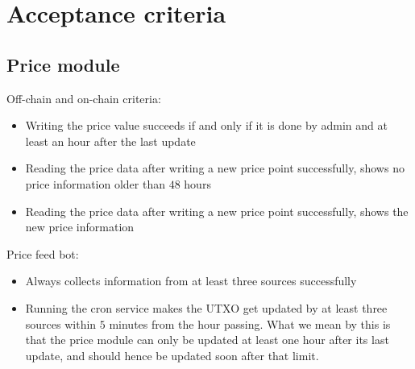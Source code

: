 \documentclass{article} %
\begin{document}
\section{Acceptance criteria}

\subsection{Price module}

Off-chain and on-chain criteria:
\begin{itemize}
  \item Writing the price value succeeds if and only if it is done by admin and
    at least an hour after the last update
  \item Reading the price data after writing a new price point successfully,
    shows no price information older than $48$ hours
  \item Reading the price data after writing a new price point successfully,
    shows the new price information
\end{itemize}

Price feed bot:
\begin{itemize}
  \item Always collects information from at least three sources successfully
  \item Running the cron service makes the UTXO get updated by at least three
    sources within $5$ minutes from the hour passing. What we mean by this is
    that the price module can only be updated at least one hour after its last
    update, and should hence be updated soon after that limit.
\end{itemize}
\end{document}

